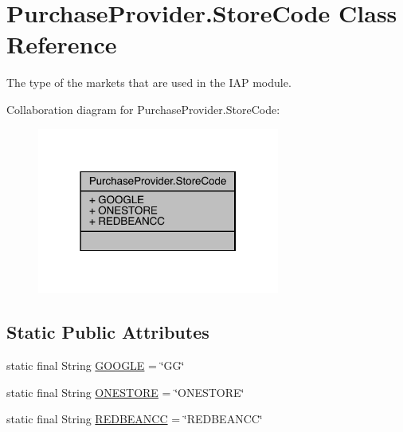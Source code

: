 \hypertarget{classcom_1_1toast_1_1android_1_1gamebase_1_1base_1_1purchase_1_1_purchase_provider_1_1_store_code}{}\section{Purchase\+Provider.\+Store\+Code Class Reference}
\label{classcom_1_1toast_1_1android_1_1gamebase_1_1base_1_1purchase_1_1_purchase_provider_1_1_store_code}


The type of the markets that are used in the I\+AP module.  




Collaboration diagram for Purchase\+Provider.\+Store\+Code\+:
\nopagebreak
\begin{figure}[H]
\begin{center}
\leavevmode
\includegraphics[width=226pt]{classcom_1_1toast_1_1android_1_1gamebase_1_1base_1_1purchase_1_1_purchase_provider_1_1_store_code__coll__graph}
\end{center}
\end{figure}
\subsection*{Static Public Attributes}
\begin{DoxyCompactItemize}
\item 
static final String \hyperlink{classcom_1_1toast_1_1android_1_1gamebase_1_1base_1_1purchase_1_1_purchase_provider_1_1_store_code_aaab107cd127e128ea2f0049ca79472aa}{G\+O\+O\+G\+LE} = \char`\"{}GG\char`\"{}
\item 
static final String \hyperlink{classcom_1_1toast_1_1android_1_1gamebase_1_1base_1_1purchase_1_1_purchase_provider_1_1_store_code_ad7c1b89292390cd973b8e4899f78fa02}{O\+N\+E\+S\+T\+O\+RE} = \char`\"{}O\+N\+E\+S\+T\+O\+RE\char`\"{}
\item 
static final String \hyperlink{classcom_1_1toast_1_1android_1_1gamebase_1_1base_1_1purchase_1_1_purchase_provider_1_1_store_code_a418e52c787b51716cb845f025ce3d223}{R\+E\+D\+B\+E\+A\+N\+CC} = \char`\"{}R\+E\+D\+B\+E\+A\+N\+CC\char`\"{}
\end{DoxyCompactItemize}


